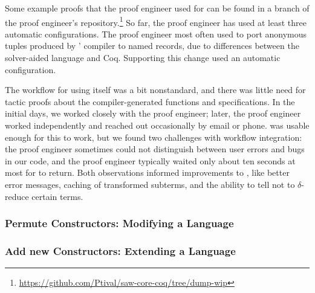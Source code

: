 \iffalse
\begin{figure*}
\begin{minipage}{0.33\textwidth}
   
\end{minipage}
\hfill
\begin{minipage}{0.66\textwidth}
   
\end{minipage}
\vspace{-0.5cm}
\caption{Two unnamed tuples (left) and corresponding named records (right).}
\label{fig:records}
\end{figure*}
\fi

Some example proofs that the proof engineer used \toolname for
can be found in a branch of the proof engineer's repository.\footnote{\url{https://github.com/Ptival/saw-core-coq/tree/dump-wip}}
So far, the proof engineer has used at least three automatic configurations.
The proof engineer most often used \toolname to port anonymous tuples produced by \company' compiler
to named records, due to differences between the solver-aided language and Coq.
Supporting this change used an automatic configuration.

The workflow for using \toolname itself was a bit nonstandard,
and there was little need for tactic proofs about the compiler-generated functions and specifications.
In the initial days, we worked closely with the proof engineer;
later, the proof engineer worked independently and reached out occasionally by email or phone.
\toolname was usable enough for this to work, but we found two challenges with workflow integration:
the proof engineer sometimes could not distinguish between user errors and bugs in our code,
and the proof engineer typically waited only about ten seconds at most for \toolname to return.
Both observations informed improvements to \toolname, like better error messages, caching of transformed subterms,
and the ability to tell \toolname not to $\delta$-reduce certain terms.

\subsubsection*{Permute Constructors: Modifying a Language}

\subsubsection*{Add new Constructors: Extending a Language}

